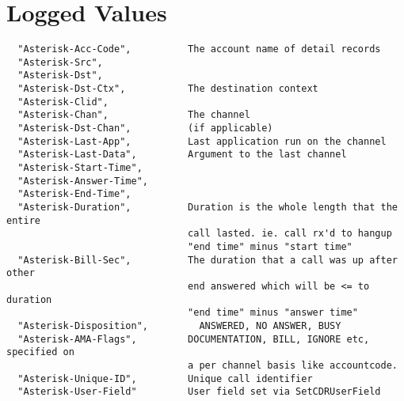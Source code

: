 \section{Logged Values}
\begin{verbatim}
  "Asterisk-Acc-Code",          The account name of detail records
  "Asterisk-Src",
  "Asterisk-Dst",
  "Asterisk-Dst-Ctx",           The destination context
  "Asterisk-Clid",
  "Asterisk-Chan",              The channel
  "Asterisk-Dst-Chan",	        (if applicable)
  "Asterisk-Last-App",	        Last application run on the channel 
  "Asterisk-Last-Data",         Argument to the last channel 
  "Asterisk-Start-Time",        
  "Asterisk-Answer-Time", 
  "Asterisk-End-Time", 
  "Asterisk-Duration",          Duration is the whole length that the entire 
                                call lasted. ie. call rx'd to hangup 
                                "end time" minus "start time" 
  "Asterisk-Bill-Sec", 	        The duration that a call was up after other 
                                end answered which will be <= to duration  
                                "end time" minus "answer time" 
  "Asterisk-Disposition",    	  ANSWERED, NO ANSWER, BUSY 
  "Asterisk-AMA-Flags",       	DOCUMENTATION, BILL, IGNORE etc, specified on 
                                a per channel basis like accountcode. 
  "Asterisk-Unique-ID",         Unique call identifier 
  "Asterisk-User-Field"	        User field set via SetCDRUserField 
\end{verbatim}
